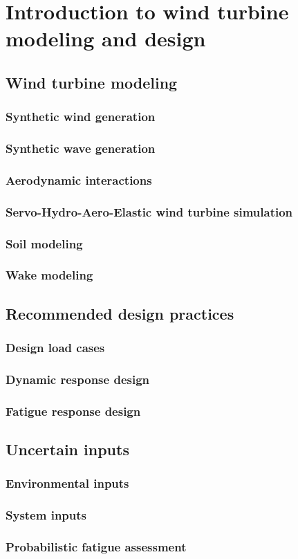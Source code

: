 \chapter{Introduction to wind turbine modeling and design}
    \section{Wind turbine modeling}
        \subsection{Synthetic wind generation }
        \subsection{Synthetic wave generation}
        \subsection{Aerodynamic interactions}
        \subsection{Servo-Hydro-Aero-Elastic wind turbine simulation }
        \subsection{Soil modeling}
        \subsection{Wake modeling }
    \section{Recommended design practices}
        \subsection{Design load cases}
        \subsection{Dynamic response design}
        \subsection{Fatigue response design}
    \section{Uncertain inputs}
        \subsection{Environmental inputs}
        \subsection{System inputs}
        \subsection{Probabilistic fatigue assessment}